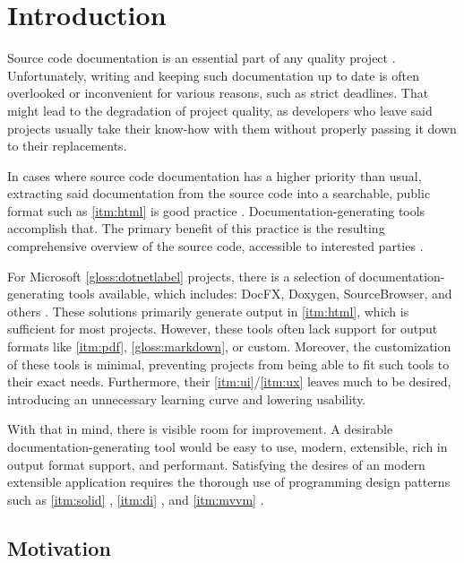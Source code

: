 \chapter*{Introduction}

Source code documentation is an essential part of any quality project \cite{rachel_why_2018}. Unfortunately, writing and keeping such documentation up to date is often overlooked or inconvenient for various reasons, such as strict deadlines. That might lead to the degradation of project quality, as developers who leave said projects usually take their know-how with them without properly passing it down to their replacements.

In cases where source code documentation has a higher priority than usual, extracting said documentation from the source code into a searchable, public format such as \ref{itm:html} is good practice \cite{smrita_benefits_2014}. Documentation-generating tools accomplish that. The primary benefit of this practice is the resulting comprehensive overview of the source code, accessible to interested parties \cite{smrita_benefits_2014}.

For Microsoft \ref{gloss:dotnetlabel} projects, there is a selection of documentation-generating tools available, which includes: DocFX, Doxygen, SourceBrowser, and others \cite{wagner_xml_2022}. These solutions primarily generate output in \ref{itm:html}, which is sufficient for most projects. However, these tools often lack support for output formats like \ref{itm:pdf}, \ref{gloss:markdown}, or custom. Moreover, the customization of these tools is minimal, preventing projects from being able to fit such tools to their exact needs. Furthermore, their \ref{itm:ui}/\ref{itm:ux} leaves much to be desired, introducing an unnecessary learning curve and lowering usability.

With that in mind, there is visible room for improvement. A desirable documentation-generating tool would be easy to use, modern, extensible, rich in output format support, and performant. Satisfying the desires of an modern extensible application requires the thorough use of programming design patterns \cite{humblot_design_2021} such as \ref{itm:solid} \cite{hall_adaptive_2017}, \ref{itm:di} \cite{deursen_dependency_2019}, and \ref{itm:mvvm} \cite{katz_mvvm_2022}.

\section*{Motivation}

